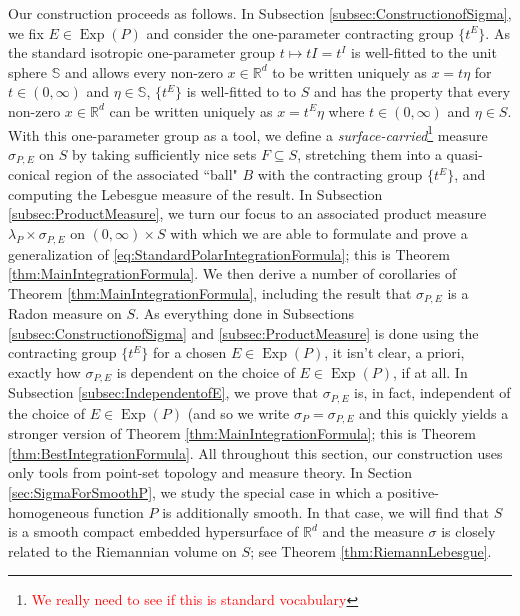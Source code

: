 \documentclass[11pt]{article}
\newcommand\Exp{\operatorname{Exp}}
\begin{document}
\noindent Our construction proceeds as follows. In Subsection \ref{subsec:ConstructionofSigma}, we fix $E\in\Exp(P)$ and consider the one-parameter contracting group $\{t^E\}$. As the standard isotropic one-parameter group $t\mapsto tI=t^I$ is well-fitted to the unit sphere $\mathbb{S}$ and allows every non-zero $x\in\mathbb{R}^d$ to be written uniquely as $x=t\eta$ for $t\in (0,\infty)$ and $\eta\in \mathbb{S}$, $\{t^E\}$ is well-fitted to to $S$ and has the property that every non-zero $x\in\mathbb{R}^d$ can be written uniquely as $x=t^E\eta$ where $t\in(0,\infty)$ and $\eta\in S$. With this one-parameter group as a tool, we define a \textit{surface-carried}\footnote{\textcolor{red}{We really need to see if this is standard vocabulary}} measure $\sigma_{P,E}$ on $S$ by taking sufficiently nice sets $F\subseteq S$, stretching them into a quasi-conical region of the associated ``ball" $B$ with the contracting group $\{t^E\}$, and computing the Lebesgue measure of the result. In Subsection \ref{subsec:ProductMeasure}, we turn our focus to an associated product measure $\lambda_P\times\sigma_{P,E}$ on $(0,\infty)\times S$ with which we are able to formulate and prove a generalization of \eqref{eq:StandardPolarIntegrationFormula}; this is Theorem \ref{thm:MainIntegrationFormula}. We then derive a number of corollaries of Theorem \ref{thm:MainIntegrationFormula}, including the result that $\sigma_{P,E}$ is a Radon measure on $S$. As everything done in Subsections \ref{subsec:ConstructionofSigma} and \ref{subsec:ProductMeasure} is done using the contracting group $\{t^E\}$ for a chosen $E\in\Exp(P)$, it isn't clear, a priori, exactly how $\sigma_{P,E}$ is dependent on the choice of $E\in\Exp(P)$, if at all. In Subsection \ref{subsec:IndependentofE}, we prove that $\sigma_{P,E}$ is, in fact, independent of the choice of $E\in \Exp(P)$ (and so we write $\sigma_P=\sigma_{P,E}$ and this quickly yields a stronger version of Theorem \ref{thm:MainIntegrationFormula}; this is Theorem \ref{thm:BestIntegrationFormula}. All throughout this section, our construction uses only tools from point-set topology and measure theory.  In Section \ref{sec:SigmaForSmoothP}, we study the special case in which a positive-homogeneous function $P$ is additionally smooth. In that case, we will find that $S$ is a smooth compact embedded hypersurface of $\mathbb{R}^d$ and the measure $\sigma$ is closely related to the Riemannian volume on $S$; see Theorem \ref{thm:RiemannLebesgue}.\\
\end{document}
